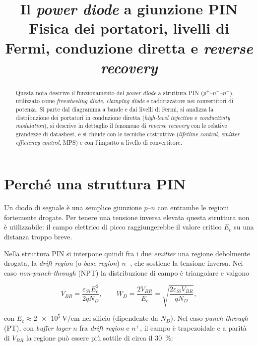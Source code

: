 \documentclass[11pt,a4paper]{article}
\title{Il \emph{power diode} a giunzione PIN\\
\large Fisica dei portatori, livelli di Fermi, conduzione diretta e \emph{reverse recovery}}
\author{}
\date{}
\begin{document}
\maketitle

\begin{abstract}
\noindent
Questa nota descrive il funzionamento del \emph{power diode} a struttura PIN
($p^{+}$--$n^{-}$--$n^{+}$), utilizzato come \emph{freewheeling diode},
\emph{clamping diode} e raddrizzatore nei convertitori di potenza. Si parte dal
diagramma a bande e dai livelli di Fermi, si analizza la distribuzione dei
portatori in conduzione diretta (\emph{high-level injection} e
\emph{conductivity modulation}), si descrive in dettaglio il fenomeno di
\emph{reverse recovery} con le relative grandezze di datasheet, e si chiude con
le tecniche costruttive (\emph{lifetime control}, \emph{emitter efficiency
control}, MPS) e con l'impatto a livello di convertitore.
\end{abstract}

\tableofcontents
\bigskip

\section{Perché una struttura PIN}

Un diodo di segnale è una semplice giunzione $p$--$n$ con entrambe le regioni
fortemente drogate. Per tenere una tensione inversa elevata questa struttura non
è utilizzabile: il campo elettrico di picco raggiungerebbe il valore critico
$E_c$ su una distanza troppo breve.

Nella struttura PIN si interpone quindi fra i due \emph{emitter} una regione
debolmente drogata, la \emph{drift region} (o \emph{base region}) $n^{-}$, che
sostiene la tensione inversa. Nel caso \emph{non-punch-through} (NPT) la
distribuzione di campo è triangolare e valgono

\begin{equation}
V_{BR} = \frac{\varepsilon_{Si} E_c^{2}}{2 q N_D},
\qquad
W_{D} = \frac{2 V_{BR}}{E_c} = \sqrt{\frac{2 \varepsilon_{Si} V_{BR}}{q N_D}} ,
\end{equation}

con $E_c \approx \SI{2e5}{\volt\per\centi\meter}$ nel silicio (dipendente da
$N_D$). Nel caso \emph{punch-through} (PT), con \emph{buffer layer} $n$ fra
\emph{drift region} e $n^{+}$, il campo è trapezoidale e a parità di $V_{BR}$ la
regione può essere più sottile di circa il \SI{30}{\percent}:
\end{document}
